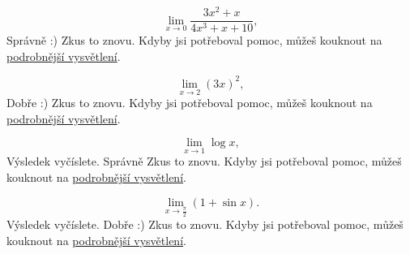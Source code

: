 \documentclass[onepage, language = czech]{webquiz}
\begin{document}
	\begin{question} %
		\[\lim_{x\to 0}\frac{3x^2+x}{4x^3+x+10},\]
		\whenRight Správně :)
		\whenWrong Zkus to znovu. Kdyby jsi potřeboval pomoc, můžeš kouknout na \href{https://www.youtube.com/watch?v=tSzMZqrAqPc&list=PLD-MTmOzXT5Meh7DoN_gPn3FSFAx-vCnT}{podrobnější vysvětlení}.
	\end{question}

	\begin{question} %
		\[\lim_{x\to 2}(3x)^2,\]
		\whenRight Dobře :)
		\whenWrong Zkus to znovu. Kdyby jsi potřeboval pomoc, můžeš kouknout na \href{https://www.youtube.com/watch?v=tSzMZqrAqPc&list=PLD-MTmOzXT5Meh7DoN_gPn3FSFAx-vCnT}{podrobnější vysvětlení}.
	\end{question}

	\begin{question} %
		\[\lim_{x\to 1}\log{x},\]
		Výsledek vyčíslete.
		\whenRight Správně
		\whenWrong Zkus to znovu. Kdyby jsi potřeboval pomoc, můžeš kouknout na \href{https://www.youtube.com/watch?v=tSzMZqrAqPc&list=PLD-MTmOzXT5Meh7DoN_gPn3FSFAx-vCnT}{podrobnější vysvětlení}.
	\end{question}
	
	\begin{question} %
		\[\lim_{x\to \frac{\pi}{2}}(1+\sin{x}).\]
		Výsledek vyčíslete.
		\whenRight Dobře :)
		\whenWrong Zkus to znovu. Kdyby jsi potřeboval pomoc, můžeš kouknout na \href{https://www.youtube.com/watch?v=tSzMZqrAqPc&list=PLD-MTmOzXT5Meh7DoN_gPn3FSFAx-vCnT}{podrobnější vysvětlení}.
	\end{question}
\end{document}
